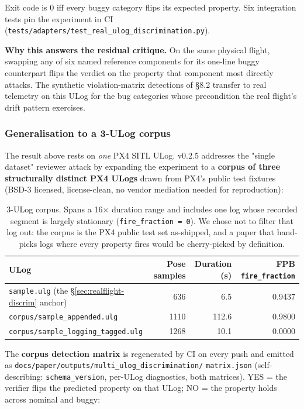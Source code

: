 \documentclass[acmsmall,nonacm=true,review=false]{acmart}
\theoremstyle{plain}
\begin{document}
Exit code is 0 iff every buggy category flips its expected
property. Six integration tests pin the experiment in CI
(\texttt{tests/adapters/test\_real\_ulog\_discrimination.py}).

\textbf{Why this answers the residual critique.} On the same
physical flight, swapping any of six named reference components
for its one-line buggy counterpart flips the verdict on the
property that component most directly attacks. The synthetic
violation-matrix detections of \S8.2 transfer to real telemetry
on this ULog for the bug categories whose precondition the real
flight's drift pattern exercises.

\subsubsection*{Generalisation to a 3-ULog corpus}
\label{sec:multi-ulog-corpus}

The result above rests on \emph{one} PX4 SITL ULog. v0.2.5
addresses the "single dataset" reviewer attack by expanding the
experiment to a \textbf{corpus of three structurally distinct
PX4 ULogs} drawn from PX4's public test fixtures (BSD-3 licensed,
license-clean, no vendor mediation needed for reproduction):

\begin{table}[h]
\centering\small
\begin{tabular}{l r r r}
\toprule
\textbf{ULog} & Pose samples & Duration (s) & FPB \texttt{fire\_fraction} \\
\midrule
\texttt{sample.ulg} (the \S\ref{sec:realflight-discrim} anchor) & 636  & 6.5   & 0.9437 \\
\texttt{corpus/sample\_appended.ulg}                            & 1110 & 112.6 & 0.9800 \\
\texttt{corpus/sample\_logging\_tagged.ulg}                     & 1268 & 10.1  & 0.0000 \\
\bottomrule
\end{tabular}
\caption{3-ULog corpus. Spans a 16$\times$ duration range and
includes one log whose recorded segment is largely stationary
(\texttt{fire\_fraction = 0}). We chose not to filter that log
out: the corpus is the PX4 public test set as-shipped, and a
paper that hand-picks logs where every property fires would be
cherry-picked by definition.}
\end{table}

The \textbf{corpus detection matrix} is regenerated by CI on
every push and emitted as
\texttt{docs/paper/outputs/multi\_ulog\_discrimination/}
\texttt{matrix.json} (self-describing: \texttt{schema\_version},
per-ULog diagnostics, both matrices). YES = the verifier flips
the predicted property on that ULog; NO = the property holds
across nominal and buggy:
\end{document}
